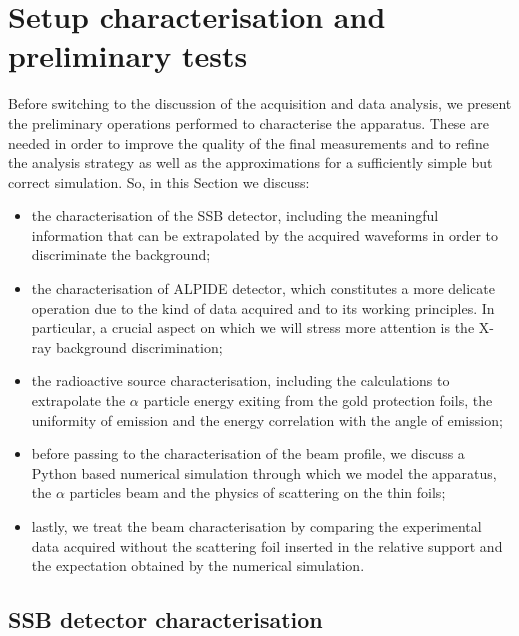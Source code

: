 \documentclass[../../main/main.tex]{subfiles}
\begin{document}
\section{Setup characterisation and preliminary tests}
\label{sec:preliminary}

Before switching to the discussion of the acquisition and data analysis, we present the preliminary operations performed to characterise the apparatus. These are needed in order to improve the quality of the final measurements and to refine the analysis strategy as well as the approximations for a sufficiently simple but correct simulation. So, in this Section we discuss:
\begin{itemize}
    \item the characterisation of the SSB detector, including the meaningful information that can be extrapolated by the acquired waveforms in order to discriminate the background;
    \item the characterisation of ALPIDE detector, which constitutes a more delicate operation due to the kind of data acquired and to its working principles. In particular, a crucial aspect on which we will stress more attention is the X-ray background discrimination;
    \item the radioactive source characterisation, including the calculations to extrapolate the \( \alpha \) particle energy exiting from the gold protection foils, the uniformity of emission and the energy correlation with the angle of emission;
    \item before passing to the characterisation of the beam profile, we discuss a Python based numerical simulation through which we model the apparatus, the \( \alpha \) particles beam and the physics of scattering on the thin foils;
    \item lastly, we treat the beam characterisation by comparing the experimental data acquired without the scattering foil inserted in the relative support and the expectation obtained by the numerical simulation.
\end{itemize}



\subsection{SSB detector characterisation}
\end{document}

